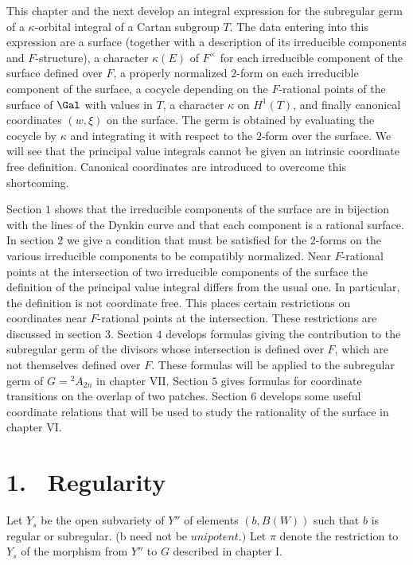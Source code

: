 \documentclass{memo-l}
\theoremstyle{definition}
\theoremstyle{remark}
\numberwithin{section}{chapter}
\numberwithin{equation}{chapter}
\begin{document}
   This chapter and the next develop an integral expression for the
subregular germ of a ${\kappa}$-orbital integral of a Cartan subgroup $T$.
The data entering into this expression are a surface (together with a
description of its irreducible components and $F$-structure), a character
${\kappa}(E)$ of $F^{\times}$ for each irreducible component of the surface
defined over $F$, a properly normalized $2$-form on each irreducible
component of the surface, a cocycle depending on the $F$-rational points of
the surface of $\Gal$ with values in $T$, a character ${\kappa}$
on $H^{1}(T)$, and finally canonical coordinates $(w,{\xi})$ on the
surface.  The germ is obtained by evaluating the cocycle by ${\kappa}$ and
integrating it with respect to the $2$-form over the surface.  We will see
that the principal value integrals cannot be given an intrinsic coordinate
free definition.  Canonical coordinates are introduced to overcome this
shortcoming.

   Section $1$ shows that the irreducible components of the surface are in
bijection with the lines of the Dynkin curve and that each component is a
rational surface.  In section $2$ we give a condition that must be
satisfied for the $2$-forms on the various irreducible components to be
compatibly normalized.  Near $F$-rational points at the intersection of two
irreducible components of the surface the definition of the principal value
integral differs from the usual one.  In particular, the definition is not
coordinate free.  This places certain restrictions on coordinates near
$F$-rational points at the intersection.  These restrictions are discussed
in section $3$.  Section $4$ develops formulas giving the contribution to
the subregular germ of the divisors whose intersection is defined over $F$,
which are not themselves defined over $F$.  These formulas will be applied
to the subregular germ of $G  =  {}^{2}A_{2n}$ in chapter VII.  Section $5$
gives formulas for coordinate transitions on the overlap of two patches.
Section $6$ develops some useful coordinate relations that will be used to
study the rationality of the surface in chapter VI.


\section{1. \ Regularity}

   Let $Y_{s}$ be the open subvariety of $Y''$ of elements $(b,B(W))$ such
that $b$ is regular or subregular.  (b need not be $unipotent.)$ Let
${\pi}$ denote the restriction to $Y_{s}$ of the morphism from $Y''$ to $G$
described in chapter I.
\end{document}
